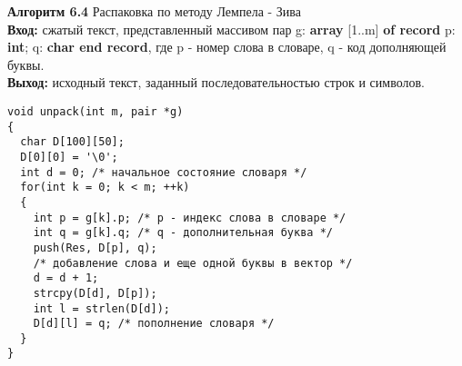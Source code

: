 \documentclass[10pt, a5paper]{article}
\begin{document}

\noindent\textbf{Алгоритм 6.4} Распаковка по методу Лемпела - Зива\\
\textbf{Вход:} сжатый текст, представленный массивом пар
g: \textbf{array} [1..m] \textbf{of record} p: \textbf{int};
q: \textbf{char end record}, где p - номер слова в словаре, q - код дополняющей буквы.\\
\textbf{Выход:} исходный текст, заданный последовательностью строк и символов.
\begin{lstlisting}
void unpack(int m, pair *g)
{
  char D[100][50];
  D[0][0] = '\0';
  int d = 0; /* начальное состояние словаря */
  for(int k = 0; k < m; ++k)
  {
    int p = g[k].p; /* p - индекс слова в словаре */
    int q = g[k].q; /* q - дополнительная буква */
    push(Res, D[p], q);
    /* добавление слова и еще одной буквы в вектор */
    d = d + 1;
    strcpy(D[d], D[p]);
    int l = strlen(D[d]);
    D[d][l] = q; /* пополнение словаря */
  }
}
\end{lstlisting}
\end{document}

